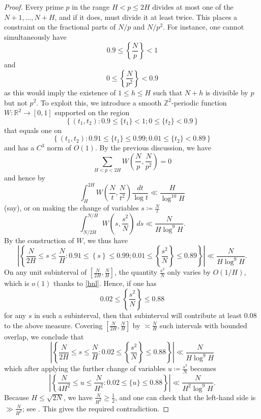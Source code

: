 \documentclass[12pt]{amsart}
\newcommand{\R}{\mathbb{R}}
\newcommand{\Z}{\mathbb{Z}}
\begin{document}
\begin{proof}
Every prime $p$ in the range $H < p \leq 2H$ divides at most one of the $N+1,\dots,N+H$, and if it does, must divide it at least twice.  This places a constraint on the fractional parts of $N/p$ and $N/p^2$. For instance, one cannot simultaneously have
    $$ 0.9 \leq \left\{\frac{N}{p}\right\} < 1$$
    and
    $$ 0 \leq \left\{\frac{N}{p^2}\right\} < 0.9$$
    as this would imply the existence of $1 \leq h \leq H$ such that $N+h$ is divisible by $p$ but not $p^2$.
    To exploit this, we introduce a smooth $\Z^2$-periodic function $W \colon \R^2 \to [0,1]$ supported on the region
    $$ \left\{ (t_1,t_2): 0.9 \leq \{t_1\} < 1; 0 \leq \{ t_2\} < 0.9 \right\}$$
    that equals one on
    $$ \left\{ (t_1,t_2): 0.91 \leq \{t_1\} \leq 0.99; 0.01 \leq \{ t_2\} < 0.89 \right\}$$
    and has a $C^3$ norm of $O(1)$.  By the previous discussion, we have
    $$ \sum_{H < p < 2H} W\left(\frac{N}{p}, \frac{N}{p^2}\right) = 0$$
    and hence by 
$$ \int_H^{2H} W\left(\frac{N}{t}, \frac{N}{t^2}\right) \frac{dt}{\log t} \ll \frac{H}{\log^{10} H}$$
(say), or on making the change of variables $s \coloneqq \frac{N}{t}$
    $$ \int_{N/2H}^{N/H} W\left(s, \frac{s^2}{N}\right) \ ds \ll \frac{N}{H\log^9 H}.$$
By the construction of $W$, we thus have
$$  \left| \left\{ \frac{N}{2H} \leq s \leq \frac{N}{H}: 0.91 \leq \left\{s\right\} \leq 0.99; 0.01 \leq \left\{ \frac{s^2}{N}\right\} \leq 0.89 \right\}\right| \ll \frac{N}{H\log^9 H}.$$
On any unit subinterval of $[\frac{N}{2H},\frac{N}{H}]$, the quantity $\frac{s^2}{N}$ only varies by $O(1/H)$, which is $o(1)$ thanks to \eqref{hnl}.  Hence, if one has
$$ 0.02 \leq \left\{ \frac{s^2}{N}\right\} \leq 0.88$$
for any $s$ in such a subinterval, then that subinterval will contribute at least $0.08$ to the above measure.  Covering $[\frac{N}{2H},\frac{N}{H}]$ by $\asymp \frac{N}{H}$ such intervals with bounded overlap, we conclude that
$$ \left| \left\{ \frac{N}{2H} \leq s \leq \frac{N}{H}: 0.02 \leq \left\{ \frac{s^2}{N}\right\} \leq 0.88 \right\}\right| \ll \frac{N}{H\log^9 H}$$
which after applying the further change of variables $u \coloneqq \frac{s^2}{N}$ becomes
\begin{equation}\label{valid}
 \left| \left\{ \frac{N}{4H^2} \leq u \leq \frac{N}{H^2}: 0.02 \leq \{ u \} \leq 0.88 \right\}\right|
\ll \frac{N}{H^2 \log^9 H}.
\end{equation}
Because $H \leq \sqrt{2N}$, we have $\frac{N}{H^2} \geq \frac{1}{2}$, and one can check that the left-hand side is $\gg \frac{N}{H^2}$; see .  This gives the required contradiction.
\end{proof}
\end{document}
